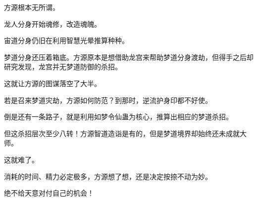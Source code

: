 \begin{this_body}
方源根本无所谓。

龙人分身开始魂修，改造魂魄。

宙道分身仍旧在利用智慧光晕推算种种。

梦道分身还压着箱底。方源原本是想借助龙宫来帮助梦道分身渡劫，但得手之后却研究发现，龙宫并无梦道防御的杀招。

这就让方源的图谋落空了大半。

若是召来梦道灾劫，方源如何防范？到那时，逆流护身印都不好使。

倒是还有一条路子，就是利用如梦令仙蛊为核心，推算出相应的梦道杀招。

但这杀招层次至少八转！方源智道造诣是有的，但是梦道境界却始终还未成就大师。

这就难了。

消耗的时间、精力必定极多，方源想了想，还是决定按捺不动为妙。

绝不给天意对付自己的机会！

\end{this_body}

